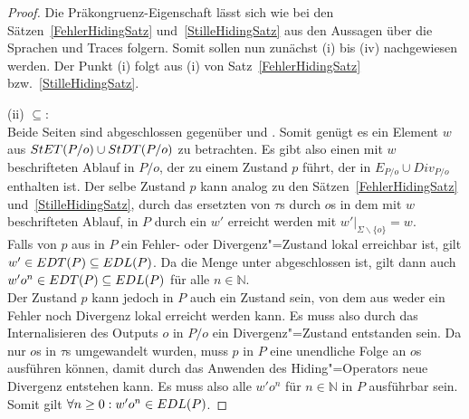 \begin{proof}
  Die Präkongruenz-Eigenschaft lässt sich wie bei den
  Sätzen~\ref{FehlerHidingSatz} und~\ref{StilleHidingSatz} aus den Aussagen
  über die Sprachen und Traces folgern. Somit sollen nun zunächst (i) bis (iv)
  nachgewiesen werden. Der Punkt (i) folgt aus (i) von
  Satz~\ref{FehlerHidingSatz} bzw.~\ref{StilleHidingSatz}.

  (ii) \glqq $\subseteq$\grqq{}:\\
  Beide Seiten sind abgeschlossen gegenüber \prune{} und \cont{}. Somit genügt
  es ein Element $w$ aus $StET (P/o)\cup StDT (P/o)$ zu betrachten. Es gibt
  also einen mit $w$ beschrifteten Ablauf in $P/o$, der zu einem Zustand $p$
  führt, der in $E_{P/o}\cup Div_{P/o}$ enthalten ist. Der selbe Zustand $p$
  kann analog zu den Sätzen~\ref{FehlerHidingSatz} und~\ref{StilleHidingSatz},
  durch das ersetzten von $\tau$s durch $o$s in dem mit $w$ beschrifteten
  Ablauf, in $P$ durch ein $w'$ erreicht werden mit
  $w'|_{\Sigma\backslash\{o\}} = w$.\\
  Falls von $p$ aus in $P$ ein Fehler- oder Divergenz"=Zustand lokal erreichbar
  ist, gilt $w'\in EDT (P)\subseteq EDL (P)$. Da die Menge \EDL{} unter
  \cont{} abgeschlossen ist, gilt dann auch $w'o^n\in EDT (P)\subseteq EDL (P)$
  für alle $n\in\mathbb{N}$.\\
  Der Zustand $p$ kann jedoch in $P$ auch ein Zustand sein, von dem aus weder
  ein Fehler noch Divergenz lokal erreicht werden kann. Es muss also durch das
  Internalisieren des Outputs $o$ in $P/o$ ein Divergenz"=Zustand entstanden
  sein. Da nur $o$s in $\tau$s umgewandelt wurden, muss $p$ in $P$ eine
  unendliche Folge an $o$s ausführen können, damit durch das Anwenden des
  Hiding"=Operators neue Divergenz entstehen kann. Es muss also alle $w'o^n$
  für $n\in\mathbb{N}$ in $P$ ausführbar sein. Somit gilt $\forall n\geq 0:
  w'o^n\in EDL (P)$.


\end{proof}
